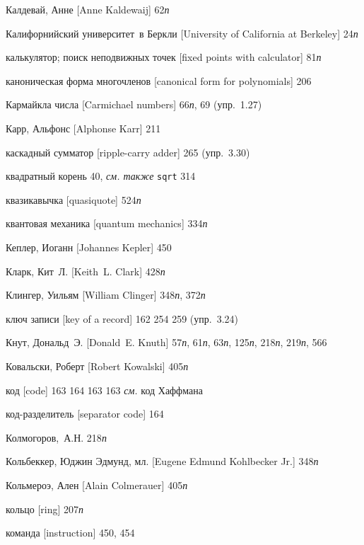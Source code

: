 \begin{theindex}
\item {Калдевай, Анне [Anne Kaldewaij]} 62{\it п}
\item {Калифорнийский университет~в Беркли [University of California at Berkeley]} 24{\it п}
\item {калькулятор; поиск неподвижных точек [fixed points with calculator]} 81{\it п}
\item {каноническая форма многочленов [canonical form for polynomials]} 206
\item {Кармайкла числа [Carmichael numbers]} 66{\it п}, 69 (упр.~1.27)
\item {Карр, Альфонс [Alphonse Karr]} 211
\item {каскадный сумматор [ripple-carry adder]} 265 (упр.~3.30)
\item {квадратный корень} 40, {\it см. также} \texttt{sqrt}
   314
\item {квазикавычка [quasiquote]} 524{\it п}
\item {квантовая механика [quantum mechanics]} 334{\it п}
\item {Кеплер, Иоганн [Johannes Kepler]} 450
\item {Кларк, Кит~Л. [Keith~L. Clark]} 428{\it п}
\item {Клингер, Уильям [William Clinger]} 348{\it п}, 372{\it п}
\item {ключ записи [key of a record]}
   162
   254
   259 (упр.~3.24)
\item {Кнут, Дональд~Э. [Donald~E. Knuth]} 57{\it п}, 61{\it п}, 63{\it п}, 125{\it п}, 218{\it п}, 219{\it п}, 566
\item {Ковальски, Роберт [Robert Kowalski]} 405{\it п}
\item {код [code]}
   163
   164
   163
   163
   {\it см.} код Хаффмана
\item {код-разделитель [separator code]} 164
\item {Колмогоров,~А.Н.} 218{\it п}
\item {Кольбеккер, Юджин Эдмунд, мл. [Eugene Edmund Kohlbecker Jr.]} 348{\it п}
\item {Кольмероэ, Ален [Alain Colmerauer]} 405{\it п}
\item {кольцо [ring]}
   207{\it п}
\item {команда [instruction]} 450, 454

\end{theindex}
